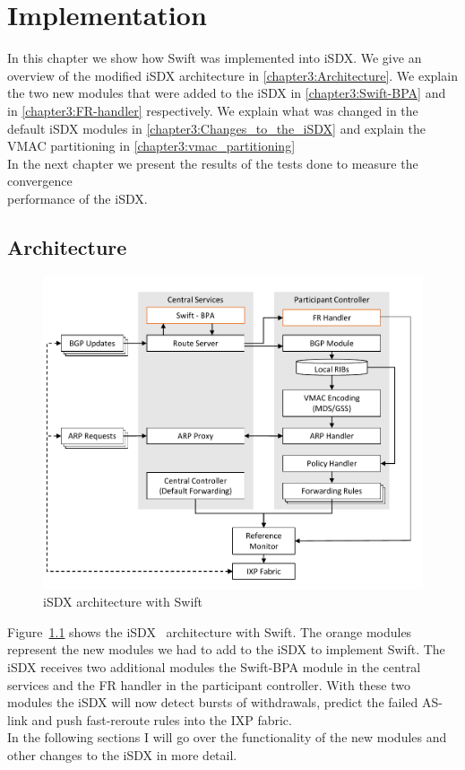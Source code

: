 \chapter{\label{chapter3}Implementation}

In this chapter we show how Swift was implemented into iSDX. We give an overview of the modified iSDX architecture in \ref{chapter3:Architecture}. We explain the two new modules that were added to the iSDX in \ref{chapter3:Swift-BPA} and in \ref{chapter3:FR-handler} respectively. We explain what was changed in the default iSDX modules in \ref{chapter3:Changes_to_the_iSDX} and explain the VMAC partitioning in \ref{chapter3:vmac_partitioning}\\
In the next chapter we present the results of the tests done to measure the convergence \\ 
performance of the iSDX.

\section{\label{chapter3:Architecture}Architecture}

\begin{figure}[h]
\center
\includegraphics[scale = 0.7]{Figures/design_sdx_swift_cropped.pdf}
\caption{iSDX architecture with Swift}
\label{fig:isdx_architecture_with_swift}
\end{figure}

Figure~\ref{fig:isdx_architecture_with_swift} shows the iSDX~\cite{feamster2013sdx} architecture with Swift. The orange modules represent the new modules we had to add to the iSDX to implement Swift. The iSDX receives two additional modules the Swift-BPA module in the central services and the FR handler in the participant controller. With these two modules the iSDX will now detect bursts of withdrawals, predict the failed AS-link and push fast-reroute rules into the IXP fabric. \\
In the following sections I will go over the functionality of the new modules and other changes to the iSDX in more detail.

